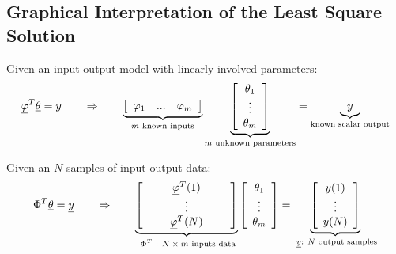 \newpage
\subsection{Graphical Interpretation of the Least Square Solution}

Given an input-output model with linearly involved parameters:
\begin{align}
	\underline{\varphi}^T \underline{\theta}
	= y
	\quad\quad\Rightarrow\quad\quad
	\underbrace{
		\left[ \begin{array}{c c c }
				   \varphi_1 & ... & \varphi_m
		\end{array} \right] }_{ m \text{ known inputs} }
	\underbrace{ \left[ \begin{array}{c}
							\theta_1 \\ \vdots \\ \theta_m
	\end{array} \right] }_{ m \text{ unknown parameters} } =
	\underbrace{y}_{\text{known scalar output} }
\end{align}

Given an $N$ samples of input-output data:
\begin{align}
	\Phi^T \underline{\theta}
	= \underline{y}
	\quad\quad\Rightarrow\quad\quad
	\underbrace{
		\left[ \begin{array}{c c c c c }
				   && \underline{\varphi}^T(1) && \\
				   && \vdots & \\
				   && \underline{\varphi}^T(N) && \\
		\end{array} \right] }_{\text{ $\Phi^T$ : $N \times m$  inputs data} }
	\left[ \begin{array}{c}
			   \theta_1 \\ \vdots \\ \theta_m
	\end{array} \right]
	= \underbrace{ \left[ \begin{array}{c}
							  y(1) \\ \vdots \\ y(N)\\
	\end{array} \right] }_{ \text{ $\underline{y}$: $N$ output samples} }
\end{align}

